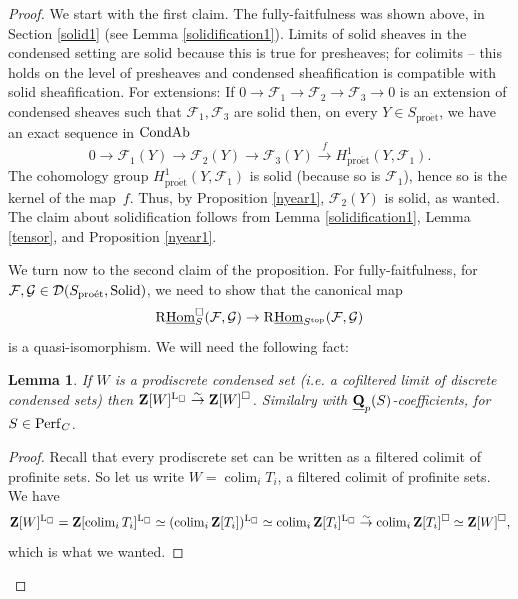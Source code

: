 \documentclass[10pt]{amsart}
\newtheorem{lemma}[equation]{Lemma}
\theoremstyle{definition}
\theoremstyle{remark}
\newcommand{\colim}{\operatorname{colim} }
\newcommand{\proeet}{\operatorname{pro\acute{e}t} }
\newcommand{\uHom}{\underline{{\rm{Hom}} }}
\newcommand{\LL}{\operatorname{L} }
\newcommand{\sff}{{\mathcal{F}}}
\newcommand{\sg}{{\mathcal{G}}}
\newcommand{\sd}{{\mathcal{D}}}
\numberwithin{equation}{section}
\def\R{{\mathrm R}}
\def\Q{{\bf Q}} \def\Z{{\bf Z}}
\numberwithin{equation}{section}
\begin{document}
  \begin{proof} We start with the first claim. The fully-faitfulness was shown above, in Section \ref{solid1} (see Lemma \ref{solidification1}). Limits of solid sheaves in the condensed setting are solid because this is true for presheaves; for colimits -- this holds on the level of presheaves and condensed sheafification is compatible with solid sheafification. For extensions: If $0\to \sff_1\to \sff_2\to \sff_3\to 0 $ is an extension of condensed sheaves such that $\sff_1,\sff_3$ are solid then, on every $Y\in S_{\proeet}$,  we have
  an exact sequence in ${\rm CondAb}$
  $$
  0\to \sff_1(Y)\to \sff_2(Y)\to \sff_3(Y)\stackrel{f}{\to} H^1_{\proeet}(Y,\sff_1). 
  $$
 The cohomology group $H^1_{\proeet}(Y,\sff_1)$ is solid (because so is $\sff_1$), hence so is 
the kernel of the map~$f$.  Thus, by Proposition \ref{nyear1}, $\sff_2(Y)$ is solid, as wanted.  The claim about solidification follows from Lemma \ref{solidification1}, Lemma \ref{tensor}, and Proposition  \ref{nyear1}.

  
   We turn now to the second claim of the proposition. For fully-faitfulness, 
for $\sff,\sg\in \sd(S_{\proeet},{\rm Solid})$, we need to show that the canonical map 
$$
\R\uHom^{\Box}_{S}(\sff,\sg  ) \to \R\uHom_{S^{\rm top}}(\sff,\sg  )
$$
is a quasi-isomorphism.  We will need the following fact:
\begin{lemma}\label{paris20}
If $W$ is a prodiscrete condensed set (i.e. a cofiltered limit of discrete condensed
sets)  then $\Z[W]^{\LL_{\Box}}\stackrel{\sim}{\to} \Z[W]^{\Box}$. Similalry with $\underline{\Q}_p(S)$-coefficients, for $S\in {\rm Perf}_C$.
\end{lemma}
\begin{proof}  Recall that  every prodiscrete set   can be written as a filtered colimit of profinite sets.
So let us write $W=\colim_iT_i$, a filtered colimit of profinite sets. We have
$$
\Z[W]^{\LL_{\Box}}=\Z[\colim_iT_i]^{\LL_{\Box}}\simeq(\colim_i\Z[T_i])^{\LL_{\Box}}\simeq \colim_i\Z[T_i]^{\LL_{\Box}}\stackrel{\sim}{\to} \colim_i\Z[T_i]^{\Box}\simeq \Z[W]^{\Box},
$$
which is what we wanted. 


\end{proof}
\end{proof}
\end{document}

